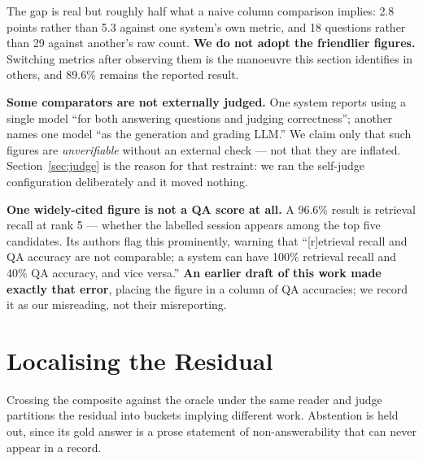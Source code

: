 The gap is real but roughly half what a naive column comparison implies: 2.8 points rather than 5.3 against one system's own metric, and 18 questions rather than 29 against another's raw count. \textbf{We do not adopt the friendlier figures.} Switching metrics after observing them is the manoeuvre this section identifies in others, and 89.6\% remains the reported result.

\textbf{Some comparators are not externally judged.} One system reports using a single model ``for both answering questions and judging correctness''; another names one model ``as the generation and grading LLM.'' We claim only that such figures are \emph{unverifiable} without an external check --- not that they are inflated. Section~\ref{sec:judge} is the reason for that restraint: we ran the self-judge configuration deliberately and it moved nothing.

\textbf{One widely-cited figure is not a QA score at all.} A 96.6\% result is retrieval recall at rank 5 --- whether the labelled session appears among the top five candidates. Its authors flag this prominently, warning that ``[r]etrieval recall and QA accuracy are not comparable; a system can have 100\% retrieval recall and 40\% QA accuracy, and vice versa.'' \textbf{An earlier draft of this work made exactly that error}, placing the figure in a column of QA accuracies; we record it as our misreading, not their misreporting.

\section{Localising the Residual}
\label{sec:residual}

Crossing the composite against the oracle under the same reader and judge partitions the residual into buckets implying different work. Abstention is held out, since its gold answer is a prose statement of non-answerability that can never appear in a record.

\begin{table}[!htbp]
\centering
\caption{Residual composition under \texttt{glm-5.2} (52 errors).}
\label{tab:residual}
\end{table}

